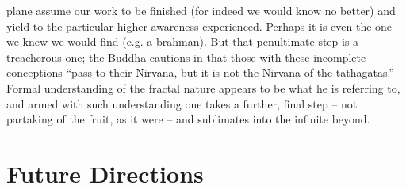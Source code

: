 \documentclass[pra,twocolumn,groupedaddress,10pt]{revtex4}
\theoremstyle{definition}
\begin{document}
plane assume our work to be finished (for indeed we would know no better) and yield to the particular higher awareness experienced. Perhaps it is even the one we knew we would find (e.g. a brahman). But that penultimate step is a treacherous one; the Buddha cautions in \cite{lankavatara} that those with these incomplete conceptions ``pass to their Nirvana, but it is not the Nirvana of the tathagatas.'' Formal understanding of the fractal nature appears to be what he is referring to, and armed with such understanding one takes a further, final step -- not partaking of the fruit, as it were -- and sublimates into the infinite beyond.


\section{Future Directions} \label{sec:futdir}
\end{document}

